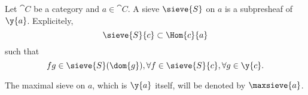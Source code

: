 \begin{definition}[Sieve]
Let $\cat{C}$ be a category and $a\in\cat{C}$.
A sieve $\sieve{S}$ on $a$ is a subpresheaf of $\y{a}$.
Explicitely, 
\[\sieve{S}{c} \subset \Hom{c}{a}\]
such that
\[fg \in \sieve{S}(\dom{g}), 
	\forall f \in \sieve{S}{c} 
	,\forall g \in \y{c} .\]

The maximal sieve on $a$, which is $\y{a}$ itself, will be denoted by $\maxsieve{a}$.
\end{definition}